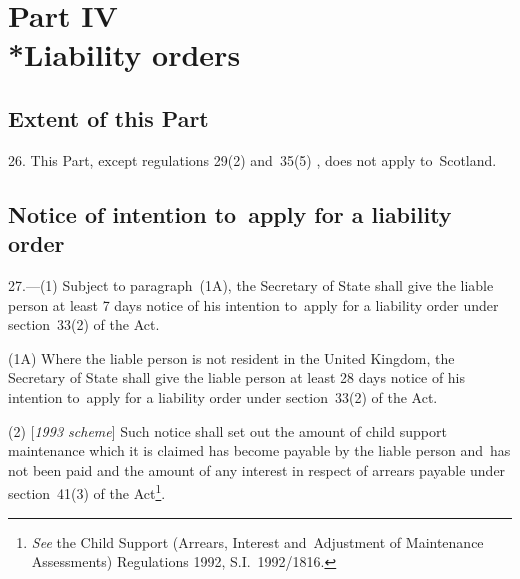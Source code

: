 \documentclass[12pt,a4paper]{article}
\begin{document}

\section[Part IV --- Liability orders]{Part IV\\*Liability orders}

\renewcommand\parthead{--- Part IV}

\subsection[26. Extent of this Part]{Extent of this Part}

26.  This Part, except 
regulations 29(2) and~35(5)%
, does not apply to~Scotland.


\subsection[27. Notice of intention to~apply for a liability order]{Notice of intention to~apply for a liability order}

27.—(1) 
Subject to paragraph~(1A),  %
the Secretary of State shall give the liable person at least 7 days notice of his intention to~apply for a liability order under section~33(2) of the Act.

(1A) Where the liable person is not resident in the United Kingdom, the Secretary of State shall give the liable person at least 28 days notice of his intention to~apply for a liability order under section~33(2) of the Act.

(2) [\emph{1993 scheme}] Such notice shall set out the amount of child support maintenance which it is claimed has become payable by the liable person and~has not been paid and the amount of any interest in respect of arrears payable under section~41(3) of the Act\footnote{\frenchspacing \emph{See} the Child Support (Arrears, Interest and~Adjustment of Maintenance Assessments) Regulations 1992, S.I.~1992/1816.}.
\end{document}

